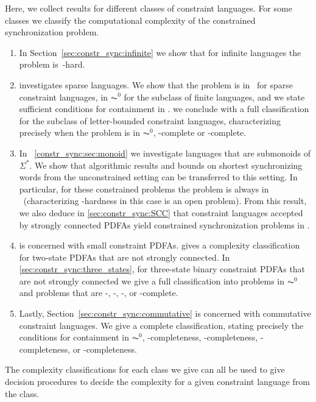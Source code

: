
Here, we collect results for different classes of constraint languages. For some classes
we classify the computational complexity of the constrained synchronization problem.

\begin{enumerate}
	\item In Section~\ref{sec:constr_sync:infinite} we show that for infinite languages the problem is~\LOGSPACE-hard. 
	
	\item {} investigates
	sparse languages. We show that the problem is in \NP\  for sparse constraint languages,
    in $\AC^0$ for the subclass of finite languages,
    and we state sufficient conditions for containment in \LOGSPACE.	
	we conclude with a full classification for the subclass of letter-bounded constraint languages, characterizing
	precisely when the problem is in $\AC^0$, \LOGSPACE-complete or \NP-complete.
		
	\item In \SEC~\ref{constr_sync:sec:monoid}
	we investigate languages that are submonoids of $\Sigma^*$.
	We show that algorithmic results and bounds on shortest synchronizing words
	from the unconstrained setting can be transferred to this setting.
	In particular, for these constrained problems the problem is 
	always in \NL\ (characterizing \NL-hardness in this case is an open problem).
	From this result, we also deduce in \cref{sec:constr_sync:SCC}
	that constraint languages accepted by strongly connected PDFAs
	yield constrained synchronization problems in \NL.
		 
	\item {} is concerned with small constraint PDFAs.
	 gives a complexity classification
	for two-state PDFAs that are not strongly connected.	
	In \cref{sec:constr_sync:three_states}, for three-state binary constraint PDFAs 
	that are not strongly connected we give a 
	full classification into problems in $\AC^0$ and problems that are \LOGSPACE-, \NL-,
	\NP-, or \PSPACE-complete.	
	
	\item Lastly, Section~\ref{sec:constr_sync:commutative} is concerned with commutative constraint languages.
	We give a complete classification, stating precisely the conditions for containment in $\AC^0$,
	\LOGSPACE-completeness, \NL-completeness, \NP-completeness,	or \PSPACE-completeness.	
\end{enumerate}

The complexity classifications for each class we give can all be used to give decision procedures
to decide the complexity for a given constraint language from the class.
